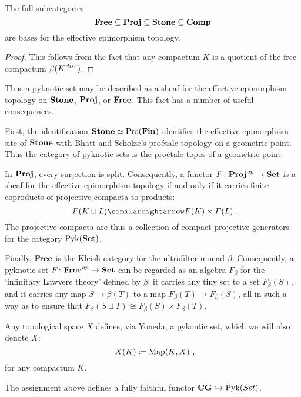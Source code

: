 \begin{lem}
	The full subcategories
	\[
		\textbf{\textup{Free}} \subseteq \textbf{\textup{Proj}} \subseteq \textbf{\textup{Stone}} \subseteq \textbf{\textup{Comp}}
	\]
	are bases for the effective epimorphism topology.
\end{lem}

\begin{proof}
	This follows from the fact that any compactum $ K $ is a quotient of the free compactum $ \beta(K^{\textit{disc}}) $.
\end{proof}

\begin{nul}
	Thus a pyknotic set may be described as a sheaf for the effective epimorphism topology on $ \textbf{\textup{Stone}} $, $ \textbf{\textup{Proj}} $, or $ \textbf{\textup{Free}} $.
	This fact has a number of useful consequences.

	First, the identification $ \textbf{\textup{Stone}} \simeq \operatorname{Pro}(\textbf{\textup{Fin}}) $ identifies the effective epimorphism site of $ \textbf{\textup{Stone}} $ with Bhatt and Scholze's proétale topology on a geometric point.
	Thus the category of pyknotic sets is the proétale topos of a geometric point.

	In $ \textbf{\textup{Proj}} $, every surjection is split.
	Consequently, a functor $ F \colon \textbf{\textup{Proj}}^{\textit{op}} \to \textbf{\textup{Set}} $ is a sheaf for the effective epimorphism topology if and only if it carries finite coproducts of projective compacta to products:
	\[
		F( K \sqcup L ) \equivalence F ( K ) \times F ( L ) \period
	\]
	The projective compacta are thus a collection of compact projective generators for the category $ \operatorname{Pyk}(\textbf{\textup{Set}}) $.

	Finally, $ \textbf{\textup{Free}} $ is the Kleisli category for the ultrafilter monad $ \beta $.
	Consequently, a pyknotic set $ F \colon \textbf{\textup{Free}}^{\textit{op}} \to \textbf{\textup{Set}} $ can be regarded as an algebra $ F_{\beta} $ for the `infinitary Lawvere theory' defined by $ \beta $:
	it carries any tiny set to a set $ F_{\beta}(S) $, and it carries any map $ S \to \beta(T) $ to a map $ F_{\beta}(T) \to F_{\beta}(S) $, all in such a way as to ensure that $ F_{\beta}(S \sqcup T) \cong F_{\beta}(S) \times F_{\beta}(T) $.
\end{nul}

\begin{exm}
	Any topological space $ X $ defines, via Yoneda, a pykontic set, which we will also denote $ X $:
	\[
		X(K) \coloneq \Map(K, X) \comma
	\]
	for any compactum $ K $.
\end{exm}

\begin{prp}
	The assignment above defines a fully faithful functor $ \textbf{\textup{CG}} \hookrightarrow \operatorname{Pyk}(Set) $.
\end{prp}

